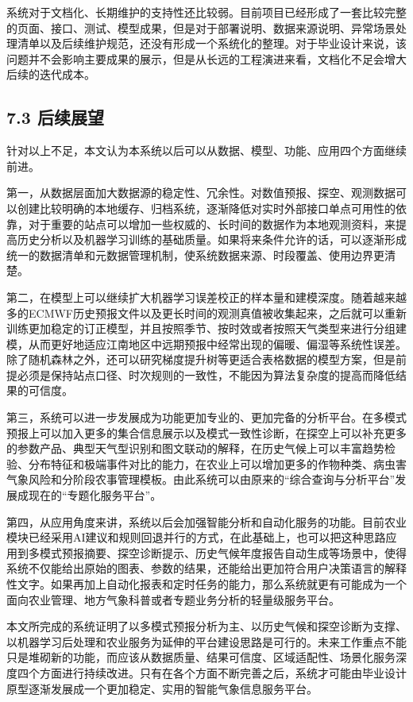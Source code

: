 系统对于文档化、长期维护的支持性还比较弱。目前项目已经形成了一套比较完整的页面、接口、测试、模型成果，但是对于部署说明、数据来源说明、异常场景处理清单以及后续维护规范，还没有形成一个系统化的整理。对于毕业设计来说，该问题并不会影响主要成果的展示，但是从长远的工程演进来看，文档化不足会增大后续的迭代成本。

\subsection{7.3 后续展望}

针对以上不足，本文认为本系统以后可以从数据、模型、功能、应用四个方面继续前进。

第一，从数据层面加大数据源的稳定性、冗余性。对数值预报、探空、观测数据可以创建比较明确的本地缓存、归档系统，逐渐降低对实时外部接口单点可用性的依靠，对于重要的站点可以增加一些权威的、长时间的数据作为本地观测资料，来提高历史分析以及机器学习训练的基础质量。如果将来条件允许的话，可以逐渐形成统一的数据清单和元数据管理机制，使系统数据来源、时段覆盖、使用边界更清楚。

第二，在模型上可以继续扩大机器学习误差校正的样本量和建模深度。随着越来越多的ECMWF历史预报文件以及更长时间的观测真值被收集起来，之后就可以重新训练更加稳定的订正模型，并且按照季节、按时效或者按照天气类型来进行分组建模，从而更好地适应江南地区中远期预报中经常出现的偏暖、偏湿等系统性误差。除了随机森林之外，还可以研究梯度提升树等更适合表格数据的模型方案，但是前提必须是保持站点口径、时次规则的一致性，不能因为算法复杂度的提高而降低结果的可信度。

第三，系统可以进一步发展成为功能更加专业的、更加完备的分析平台。在多模式预报上可以加入更多的集合信息展示以及模式一致性诊断，在探空上可以补充更多的参数产品、典型天气型识别和图文联动的解释，在历史气候上可以丰富趋势检验、分布特征和极端事件对比的能力，在农业上可以增加更多的作物种类、病虫害气象风险和分阶段农事管理模板。由此系统可以由原来的“综合查询与分析平台”发展成现在的“专题化服务平台”。

第四，从应用角度来讲，系统以后会加强智能分析和自动化服务的功能。目前农业模块已经采用AI建议和规则回退并行的方式，在此基础上，也可以把这种思路应用到多模式预报摘要、探空诊断提示、历史气候年度报告自动生成等场景中，使得系统不仅能给出原始的图表、参数的结果，还能给出更加符合用户决策语言的解释性文字。如果再加上自动化报表和定时任务的能力，那么系统就更有可能成为一个面向农业管理、地方气象科普或者专题业务分析的轻量级服务平台。

本文所完成的系统证明了以多模式预报分析为主、以历史气候和探空诊断为支撑、以机器学习后处理和农业服务为延伸的平台建设思路是可行的。未来工作重点不能只是堆砌新的功能，而应该从数据质量、结果可信度、区域适配性、场景化服务深度四个方面进行持续改进。只有在各个方面不断完善之后，系统才可能由毕业设计原型逐渐发展成一个更加稳定、实用的智能气象信息服务平台。

